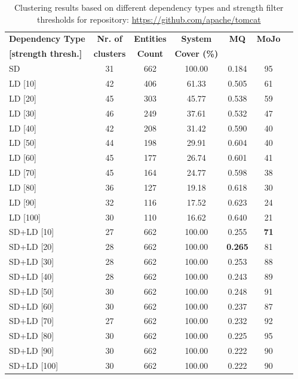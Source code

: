 \documentclass{ieeeaccess}
\begin{document}
\begin{table}
\caption{Clustering results based on different dependency types and strength filter thresholds for repository: \href{https://github.com/apache/tomcat}{https://github.com/apache/tomcat}}
\label{tab:clustering_results_tomcat}
\centering
\setlength{\tabcolsep}{3pt}
\begin{tabular}{|l|c|c|c|c|c|c|}
\hline
\textbf{Dependency Type} & \textbf{Nr. of} & \textbf{Entities} & \textbf{System} & \textbf{MQ} & \textbf{MoJo} \\
\textbf{[strength thresh.]} & \textbf{clusters} & \textbf{Count} & \textbf{Cover (\%)} &  &  \\
\hline
SD & 31 & 662 & 100.00 & 0.184 & 95 \\
\hline
LD [10] & 42 & 406 & 61.33 & 0.505 & 61 \\
LD [20] & 45 & 303 & 45.77 & 0.538 & 59 \\
LD [30] & 46 & 249 & 37.61 & 0.532 & 47 \\
LD [40] & 42 & 208 & 31.42 & 0.590 & 40 \\
LD [50] & 44 & 198 & 29.91 & 0.604 & 40 \\
LD [60] & 45 & 177 & 26.74 & 0.601 & 41 \\
LD [70] & 45 & 164 & 24.77 & 0.598 & 38 \\
LD [80] & 36 & 127 & 19.18 & 0.618 & 30 \\
LD [90] & 32 & 116 & 17.52 & 0.623 & 24 \\
LD [100] & 30 & 110 & 16.62 & 0.640 & 21 \\
\hline
SD+LD [10] & 27 & 662 & 100.00 & 0.255 &  \cellcolor[HTML]{C0C0C0}\textbf{71} \\
SD+LD [20] & 28 & 662 & 100.00 &  \cellcolor[HTML]{C0C0C0}\textbf{0.265} & 81 \\
SD+LD [30] & 28 & 662 & 100.00 & 0.253 & 88 \\
SD+LD [40] & 28 & 662 & 100.00 & 0.243 & 89 \\
SD+LD [50] & 30 & 662 & 100.00 & 0.248 & 91 \\
SD+LD [60] & 30 & 662 & 100.00 & 0.237 & 87 \\
SD+LD [70] & 27 & 662 & 100.00 & 0.232 & 92 \\
SD+LD [80] & 30 & 662 & 100.00 & 0.225 & 95 \\
SD+LD [90] & 30 & 662 & 100.00 & 0.222 & 90 \\
SD+LD [100] & 30 & 662 & 100.00 & 0.222 & 90 \\
\hline
\end{tabular}
\end{table}
\end{document}
